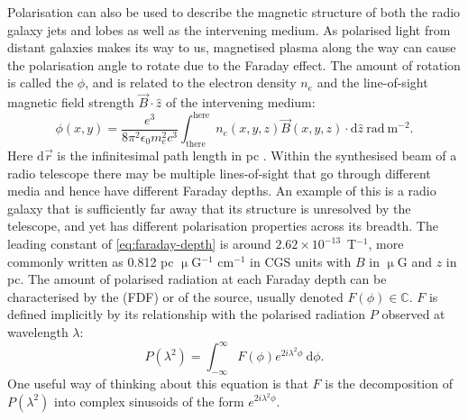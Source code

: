         Polarisation can also be used to describe the magnetic structure of both the radio galaxy jets and lobes as well as the intervening medium. As polarised light from distant galaxies makes its way to us, magnetised plasma along the way can cause the polarisation angle to rotate due to the Faraday effect. The amount of rotation is called the  $\phi$, and is related to the electron density $n_e$ and the line-of-sight magnetic field strength $\vec B \cdot \hat{z}$ of the intervening medium:
        \begin{equation}
            \label{eq:faraday-depth}
            \phi(x, y) = \frac{e^3}{8\pi^2\epsilon_0m_e^2c^3} \int_{\mathrm{there}}^{\mathrm{here}} n_e(x, y, z) \vec B(x, y, z) \cdot \mathrm{d}\hat{z}\ \mathrm{rad}\ \mathrm{m}^{-2}.
        \end{equation}
        Here $\mathrm{d}\vec r$ is the infinitesimal path length in pc \citep{brentjens_faraday_2005} . Within the synthesised beam of a radio telescope there may be multiple lines-of-sight that go through different media and hence have different Faraday depths. An example of this is a radio galaxy that is sufficiently far away that its structure is unresolved by the telescope, and yet has different polarisation properties across its breadth. The leading constant of \autoref{eq:faraday-depth} is around $2.62 \times 10^{-13}$~T$^{-1}$, more commonly written as 0.812 pc $\upmu$G$^{-1}$ cm$^{-1}$ in CGS units with $B$ in $\upmu$G and $z$ in pc. The amount of polarised radiation at each Faraday depth can be characterised by the  (FDF) or  of the source, usually denoted $F(\phi) \in \mathbb C$. $F$ is defined implicitly by its relationship with the polarised radiation $P$ observed at wavelength $\lambda$:
        \begin{equation}
            \label{eq:faraday-dispersion-function}
            P(\lambda^2) = \int_{-\infty}^\infty F(\phi) e^{2i\lambda^2\phi}\ \mathrm{d}\phi.
        \end{equation}
        One useful way of thinking about this equation is that $F$ is the decomposition of $P(\lambda^2)$ into complex sinusoids of the form $e^{2i\lambda^2\phi}$.

